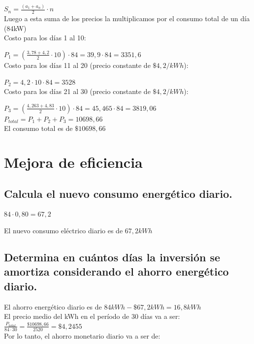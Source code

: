 \documentclass[11pt, a4paper]{article}
\begin{document}
$S_n = \frac{(a_1 + a_n)}{2} \cdot n$ \\

Luego a  esta suma de los precios la multiplicamos por el consumo total de un día (84kW) \\

Costo para los días 1 al 10:

$P_1 = (\frac{3,78 + 4,2}{2} \cdot 10) \cdot 84  = 39,9 \cdot 84 = 3351,6$ \\

Costo para los días 11 al 20 (precio constante de $\$4,2/kWh$):

$P_2 = 4,2 \cdot 10 \cdot 84 = 3528 $\\

Costo para los días 21 al 30 (precio constante de $\$4,2/kWh$):

$P_3 = (\frac{4,263 + 4,83}{2} \cdot 10) \cdot 84  = 45,465 \cdot 84 = 3819,06$ \\


$P_{total} = P_1 + P_2 + P_3 = 10698,66$ \\

El consumo total es de $\$10698,66$

\section{Mejora de eficiencia}

\subsection{Calcula el nuevo consumo energético diario.}

$84 \cdot 0,80 = 67,2$

El nuevo consumo eléctrico diario es de $67,2 kWh$

\subsection{Determina en cuántos días la inversión se amortiza considerando el ahorro energético diario.}

El ahorro energético diario es de $84kWh-\$67,2kWh = 16,8kWh$ \\

El precio medio del kWh en el período de 30 días va a ser:
$\frac{P_{total}}{84\cdot 30} = \frac{\$10698,66}{2520} = \$4,2455$ \\

Por lo tanto, el ahorro monetario diario va a ser de: \\
\end{document}

